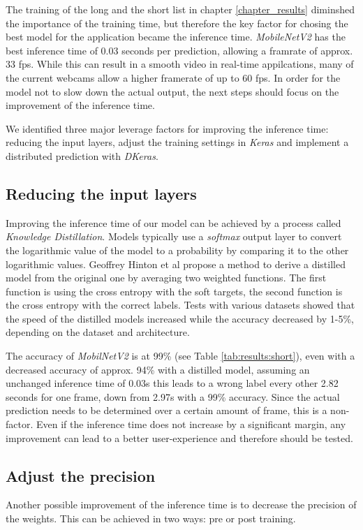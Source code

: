 The training of the long and the short list in chapter \ref{chapter_results} diminshed the importance of the training time, but therefore the key factor for chosing the best model for the application became the inference time. \textit{MobileNetV2} has the best inference time of 0.03 seconds per prediction, allowing a framrate of approx. 33 fps. While this can result in a smooth video in real-time appilcations, many of the current webcams allow a higher framerate of up to 60 fps. In order for the model not to slow down the actual output, the next steps should focus on the improvement of the inference time.

We identified three major leverage factors for improving the inference time: reducing the input layers, adjust the training settings in \textit{Keras} and implement a distributed prediction with \textit{DKeras}.

\subsection{Reducing the input layers}\label{chapter_distill}
Improving the inference time of our model can be achieved by a process called \textit{Knowledge Distillation}\cite{hinton2015distilling}. Models typically use a \textit{softmax} output layer to convert the logarithmic value of the model to a probability by comparing it to the other logarithmic values. Geoffrey Hinton et al\cite{hinton2015distilling} propose a method to derive a distilled model from the original one by averaging two weighted functions. The first function is using the cross entropy with the soft targets, the second function is the cross entropy with the correct labels. Tests with various datasets showed that the speed of the distilled models increased while the accuracy decreased by 1-5\%, depending on the dataset and architecture.

The accuracy of \textit{MobilNetV2} is at 99\% (see Table \ref{tab:results:short}), even with a decreased accuracy of approx. 94\% with a distilled model, assuming an unchanged inference time of 0.03s this leads to a wrong label every other 2.82 seconds for one frame, down from 2.97s with a 99\% accuracy. Since the actual prediction needs to be determined over a certain amount of frame, this is a non-factor. Even if the inference time does not increase by a significant margin, any improvement can lead to a better user-experience and therefore should be tested.

\subsection{Adjust the precision}
Another possible improvement of the inference time is to decrease the precision of the weights. This can be achieved in two ways: pre or post training.

